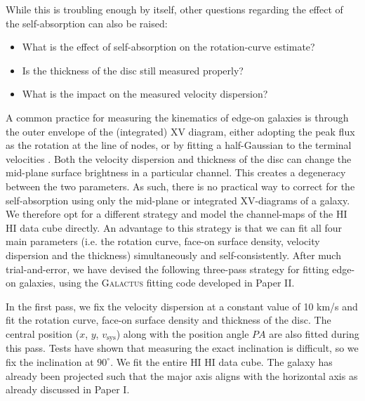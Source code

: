 \documentclass[useAMS,usenatbib]{mn2e}
\newcommand{\hi}{%
  \relax
  \ifmmode
    \textrm{\textsc{HI}}
  \else
    \textsc{H{\smaller}I}
  \fi
}
\begin{document}
While this is troubling enough by itself, other questions regarding the 
effect of the self-absorption can also be raised:
\begin{itemize}
 \item What is the effect of self-absorption on the rotation-curve estimate?
 \item Is the thickness of the disc still measured properly?
 \item What is the impact on the measured velocity dispersion?
\end{itemize}

A common practice for measuring the kinematics of edge-on galaxies is 
through the outer envelope of the (integrated) XV diagram, either adopting 
the peak flux as the rotation at the line of nodes, or by fitting a 
half-Gaussian to the terminal velocities 
\citep[e.g.][and references therein]{Sancisi1979A,Olling1996A,kk04, OBrien2010B, OBrien2010C}.
Both the velocity dispersion and thickness of the disc can 
change the mid-plane surface brightness in a particular channel.
This creates a degeneracy between the two parameters. 
As such, there is no practical way to correct for the 
self-absorption using only the mid-plane or integrated XV-diagrams 
of a galaxy. 
We therefore opt for a different strategy and model 
the channel-maps of the  \hi data cube directly.
An advantage to this strategy is that we can fit all 
four main parameters (i.e. the rotation curve, face-on 
surface density, velocity dispersion and the thickness) 
simultaneously and self-consistently.
After much trial-and-error, we have devised the following 
three-pass strategy for fitting edge-on galaxies, using 
the \textsc{Galactus} fitting code developed in Paper II.

In the first pass, we fix the velocity dispersion at a 
constant value of 10 km/s and fit the rotation curve, 
face-on surface density and thickness of the disc.
The central position ($x$, $y$, $v_\textrm{sys}$) along 
with the position angle $PA$ are also fitted during this pass.
Tests have shown that measuring the exact inclination is 
difficult, so we fix the inclination at $90^\circ$.
We fit the entire \hi data cube. The galaxy has already been projected 
such that the major axis aligns with the horizontal axis as already discussed 
in Paper I.
 
\end{document}
